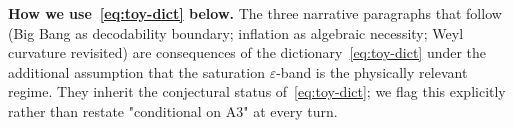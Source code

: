 \documentclass[epjc3,twocolumn]{svjour3}
\begin{document}
\medskip\noindent\textbf{How we use~\eqref{eq:toy-dict} below.}\;
The three narrative paragraphs that follow (Big Bang as decodability
boundary; inflation as algebraic necessity; Weyl curvature revisited)
are consequences of the dictionary~\eqref{eq:toy-dict} under the
additional assumption that the saturation $\varepsilon$-band is the
physically relevant regime. They inherit the conjectural status
of~\eqref{eq:toy-dict}; we flag this explicitly rather than restate
"conditional on A3" at every turn.

\end{document}
